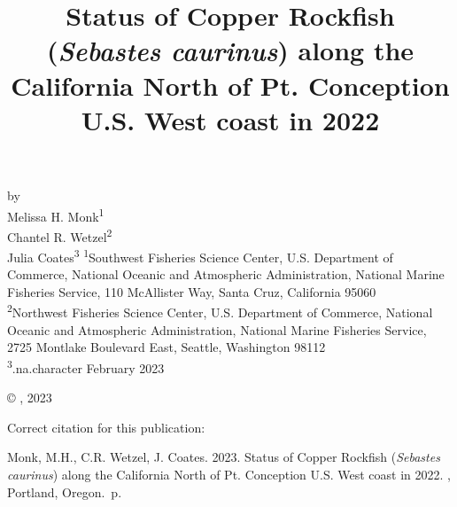 \documentclass[11pt,
  english,
  letterpaper,
]{article}
\date{}
\newcommand{\trTitle}{Status of Copper Rockfish (\emph{Sebastes caurinus}) along the California North of Pt. Conception U.S. West coast in 2022}
\newcommand{\trYear}{2023}
\newcommand{\trMonth}{February}
\newcommand{\trAuthsBack}{Monk, M.H., C.R. Wetzel, J. Coates}
\newcommand{\trCitation}{
\begin{hangparas}{1em}{1}
\trAuthsBack{}. \trYear{}. \trTitle{}. \glsentrylong{pfmc}, Portland, Oregon. \pageref{LastPage}{}\,p.
\end{hangparas}}
\begin{document}

\renewcommand*{\thefootnote}{\fnsymbol{footnote}}

\small
\thispagestyle{empty}
\noindent
\begin{center}
\title{Status of Copper Rockfish (\emph{Sebastes caurinus}) along the California North of Pt. Conception U.S. West coast in 2022}
\vspace{1.5cm}
{\Large\textbf{}}
\vfill
by\\
Melissa H. Monk\textsuperscript{1}\\
Chantel R. Wetzel\textsuperscript{2}\\
Julia Coates\textsuperscript{3}\vfill
\textsuperscript{1}Southwest Fisheries Science Center, U.S. Department of Commerce, National Oceanic and Atmospheric Administration, National Marine Fisheries Service, 110 McAllister Way, Santa Cruz, California 95060\\
\textsuperscript{2}Northwest Fisheries Science Center, U.S. Department of Commerce, National Oceanic and Atmospheric Administration, National Marine Fisheries Service, 2725 Montlake Boulevard East, Seattle, Washington 98112\\
\textsuperscript{3}.na.character\vfill
\trMonth{} \trYear{}
\end{center}
\clearpage

\thispagestyle{empty}
\vspace*{\fill}
\begin{center}
\copyright{} , \trYear{}\\
\end{center}
\par
\bigskip
\noindent
Correct citation for this publication:
\bigskip
\par
\trCitation{}
\clearpage


\tableofcontents\clearpage
\label{TRlastRoman}
\clearpage

\newpage
\thispagestyle{empty} %

\pagestyle{plain}  %
\renewcommand*{\thefootnote}{\arabic{footnote}}  %
\setcounter{footnote}{0}  %
\renewcommand{\headrulewidth}{0.5pt}
\renewcommand{\footrulewidth}{0.5pt}
\end{document}

